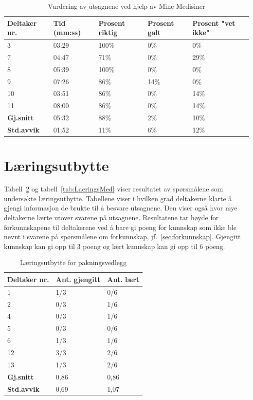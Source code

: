 \begin{table}[H]
    \centering
    \begin{tabular}{ | p{2cm} | p{2cm} | p{2cm} | p{2cm} | p{2cm} | }
      \hline
       \textbf{Deltaker nr.} & \textbf{Tid (mm:ss)} & \textbf{Prosent riktig} & \textbf{Prosent galt} & \textbf{Prosent "vet ikke"} \\ \hline
        3 & 03:29 & 100\% & 0\% & 0\% \\ \hline
        7 & 04:47 & 71\% & 0\% & 29\% \\ \hline
        8 & 05:39 & 100\% & 0\% & 0\% \\ \hline
        9 & 07:26 & 86\% & 14\% & 0\% \\ \hline
        10 & 03:51 & 86\% & 0\% & 14\% \\ \hline
        11 & 08:00 & 86\% & 0\% & 14\% \\ \hline \hline
        \textbf{Gj.snitt} & 05:32 & 88\% & 2\% & 10\% \\ \hline
        \textbf{Std.avvik} & 01:52 & 11\% & 6\% & 12\% \\ \hline
    \end{tabular}
    \caption{Vurdering av utsagnene ved hjelp av Mine Medisiner}
    \label{tab:PaastanderMed}
\end{table}

\section{Læringsutbytte}
Tabell~\ref{tab:LaeringsPak} og tabell~\ref{tab:LaeringsMed} viser resultatet av spørsmålene som undersøkte læringsutbytte. Tabellene viser i hvilken grad deltakerne klarte å gjengi informasjon de brukte til å besvare utsagnene. Den viser også hvor mye deltakerne lærte utover svarene på utsagnene. Resultatene tar høyde for forkunnskapene til deltakerene ved å bare gi poeng for kunnskap som ikke ble nevnt i svarene på spørsmålene om forkunnskap, jf.~\ref{sec:forkunnskap}. Gjengitt kunnskap kan gi opp til 3 poeng og lært kunnskap kan gi opp til 6 poeng.

\begin{table}[H]
    \centering
    \begin{tabular}{ | p{2.6cm} | p{2.6cm} | p{2.6cm} | }
      \hline
       \textbf{Deltaker nr.} & \textbf{Ant. gjengitt} & \textbf{Ant. lært}\\ \hline
        1 & 1/3 & 0/6\\ \hline
        2 & 0/3 & 1/6 \\ \hline
        4 & 0/3 & 1/6 \\ \hline
        5 & 0/3 & 0/6 \\ \hline
        6 & 1/3 & 1/6\\ \hline
        12 & 3/3 & 2/6\\ \hline
        13 & 1/3 & 2/6 \\ \hline
        \textbf{Gj.snitt} & 0,86 & 0,86 \\ \hline
        \textbf{Std.avvik} & 0,69 & 1,07 \\ \hline
    \end{tabular}
    \caption{Læringsutbytte for pakningsvedlegg}
    \label{tab:LaeringsPak}
\end{table}


